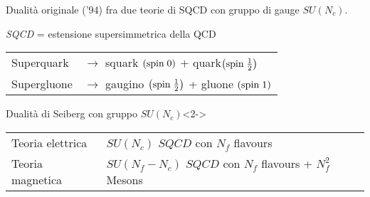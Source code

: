 \documentclass[10pt,compress]{beamer}
\begin{document}
\begin{frame}
Dualità originale ('94) fra due teorie di SQCD con gruppo di gauge $SU(N_c)$.\\
\vspace{0.5cm}

{ \centering \emph{SQCD} = estensione supersimmetrica della QCD \\
}\begin{table}
\begin{tabular}{l l}
Superquark \quad & $\longrightarrow$ \quad squark $\left( \hbox{spin} \;  0 \right)$ + quark$\left (\hbox{spin} \;  \frac{1}{2} \right)$ \\
Supergluone \quad &  $\longrightarrow$ \quad gaugino $\left (\hbox{spin} \;  \frac{1}{2} \right)$ + gluone  $\left( \hbox{spin} \;  1 \right)$ \\
\end{tabular}
\end{table}

\begin{block}{Dualità di Seiberg con gruppo $SU(N_c)$}<2->

\begin{table}
\begin{tabular}{l l}
Teoria elettrica  & $SU(N_c)$  $SQCD$ con $N_f$  flavours \\[0.2cm]
Teoria magnetica & $SU(N_f - N_c)$  $SQCD$ con $N_f$ flavours  + $N_f^2$  Mesons\\
\end{tabular}
\end{table}
\end{block}
\end{frame}
\end{document}
